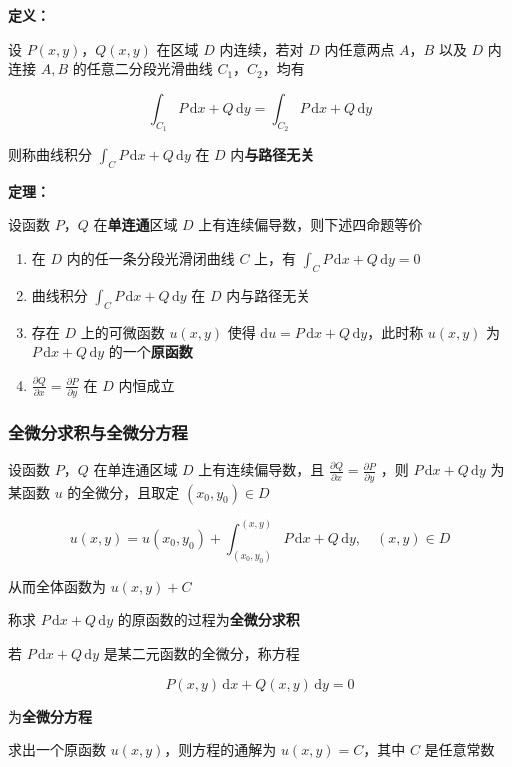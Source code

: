 \documentclass[lang = zh , final , oneside , openany , titlepage , zihao = -4 , linespread = 1.3 , baselineskip = false , cjk-font = windows , text-font = newtx , math-font = newtx]{sjtureport}
\begin{document}
\textbf{定义：}

设 \(P(x,y)\)，\(Q(x,y)\) 在区域 \(D\) 内连续，若对 \(D\) 内任意两点 \(A\)，\(B\) 以及 \(D\) 内连接 \(A,B\) 的任意二分段光滑曲线 \(C_1\)，\(C_2\)，均有

\[
\int_{C_1} P\,\mathrm{d}x +Q\,\mathrm{d}y = \int_{C_2} P\,\mathrm{d}x +Q\,\mathrm{d}y
\]

则称曲线积分 \(\int_C P\,\mathrm{d}x +Q\,\mathrm{d}y\) 在 \(D\) 内\textbf{与路径无关}

\textbf{定理：}

设函数  \(P\)，\(Q\) 在\textbf{单连通}区域 \(D\) 上有连续偏导数，则下述四命题等价

\begin{enumerate}
    \item 在 \(D\) 内的任一条分段光滑闭曲线 \(C\) 上，有 \(\int_C P\,\mathrm{d}x +Q\,\mathrm{d}y = 0\)
    \item 曲线积分 \(\int_C P\,\mathrm{d}x +Q\,\mathrm{d}y\) 在 \(D\) 内与路径无关
    \item 存在 \(D\) 上的可微函数 \(u(x,y)\) 使得 \(\mathrm{d}u = P\,\mathrm{d}x +Q\,\mathrm{d}y\)，此时称 \(u(x,y)\) 为 \(P\,\mathrm{d}x +Q\,\mathrm{d}y\) 的一个\textbf{原函数}
    \item \(\frac{\partial Q}{\partial x} = \frac{\partial P}{\partial y}\) 在 \(D\) 内恒成立
\end{enumerate}

\subsubsection{全微分求积与全微分方程}

设函数 \(P\)，\(Q\) 在单连通区域 \(D\) 上有连续偏导数，且 \(\frac{\partial Q}{\partial x} = \frac{\partial P}{\partial y}\) ，则 \(P\,\mathrm{d}x +Q\,\mathrm{d}y\) 为某函数 \(u\) 的全微分，且取定 \((x_0,y_0)\in D\)

\[
u(x,y) = u(x_0,y_0) + \int_{(x_0,y_0)}^{(x,y)} P\,\mathrm{d}x +Q\,\mathrm{d}y,\quad (x,y)\in D
\]

从而全体函数为 \(u(x,y) + C\)

称求 \(P\,\mathrm{d}x +Q\,\mathrm{d}y\) 的原函数的过程为\textbf{全微分求积}

若 \(P\,\mathrm{d}x +Q\,\mathrm{d}y\) 是某二元函数的全微分，称方程

\[
P(x,y)\,\mathrm{d}x +Q(x,y)\,\mathrm{d}y = 0
\]

为\textbf{全微分方程}

求出一个原函数 \(u(x,y)\)，则方程的通解为 \(u(x,y) = C\)，其中 \(C\) 是任意常数
\end{document}
